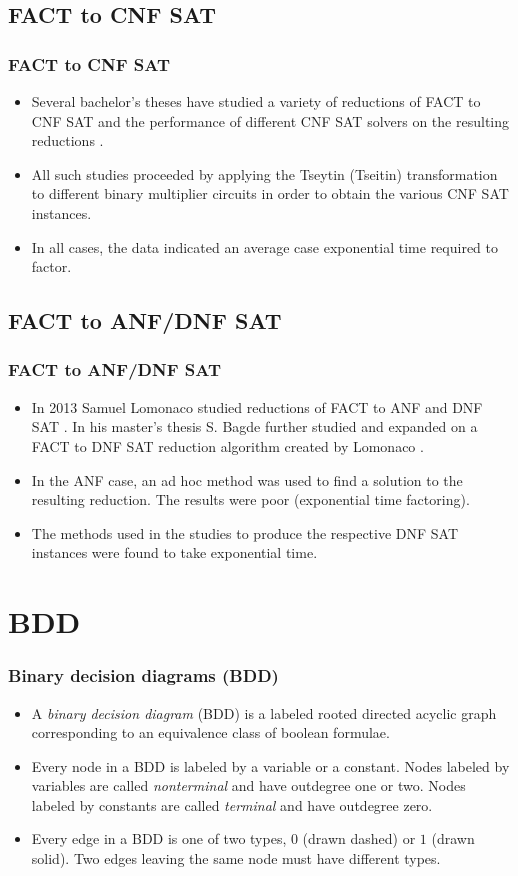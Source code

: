 \documentclass{beamer}
\begin{document}
\subsection[FACT to CNF SAT]{FACT to CNF SAT}
\begin{frame}
\frametitle{FACT to CNF SAT}
\begin{itemize}
\item Several bachelor's theses have studied a variety of reductions of FACT to CNF SAT and the performance of different CNF SAT solvers on the resulting reductions \cite{Aske/2014} \cite{ErHo/2014} \cite{FoLu/2015}.
\item All such studies proceeded by applying the Tseytin (Tseitin) transformation to different binary multiplier circuits in order to obtain the various CNF SAT instances.
\item In all cases, the data indicated an average case exponential time required to factor. 
\end{itemize}
\end{frame}

\subsection[FACT to ANF/DNF SAT]{FACT to ANF/DNF SAT}
\begin{frame}
\frametitle{FACT to ANF/DNF SAT}
\begin{itemize}
\item In 2013 Samuel Lomonaco studied reductions of FACT to ANF and DNF SAT \cite{Lomo/2013}. In his master's thesis S. Bagde further studied and expanded on a FACT to DNF SAT reduction algorithm created by Lomonaco \cite{Bagd/2013}.
\item In the ANF case, an ad hoc method was used to find a solution to the resulting reduction. The results were poor (exponential time factoring).
\item The methods used in the studies to produce the respective DNF SAT instances were found to take exponential time. 
\end{itemize}
\end{frame}

\section[BDD]{BDD}
\begin{frame}
\frametitle{Binary decision diagrams (BDD)}
\begin{itemize}
\item A \textit{binary decision diagram} (BDD) is a labeled rooted directed acyclic graph corresponding to an equivalence class of boolean formulae.
\pause
\item Every node in a BDD is labeled by a variable or a constant. Nodes labeled by variables are called \textit{nonterminal} and have outdegree one or two. Nodes labeled by constants are called \textit{terminal} and have outdegree zero.
\pause
\item Every edge in a BDD is one of two types, $0$ (drawn dashed) or $1$ (drawn solid). Two edges leaving the same node must have different types. 
\end{itemize}
\end{frame}
\end{document}
